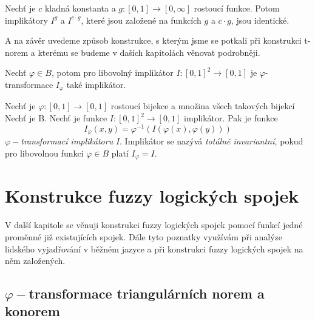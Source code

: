 \begin{sentence} \cite{habilitace}
    Nech\v t je $c$ kladn\'a konstanta a $g:[0,1] \to [0,\infty]$
    rostoucí  funkce. Potom implik\'atory $I^g$ a $I^{c \cdot g}$,
    které jsou zalo\v zen\'e na  funkcích $g$ a $c \cdot g$, jsou
    identick\'e.
\end{sentence}
A na z\'av\v er uvedeme zp\r usob konstrukce, s kter\'ym jsme se potkali p\v ri konstrukci t-norem a kter\'emu se budeme v da\v s\'ich kapitol\'ach v\v enovat podrobn\v eji.
\begin{sentence}\cite{Springer}
    Nech\v t $\varphi \in B$, potom pro libovolný implikátor $I: [0,1]^2 \rightarrow [0,1]$ je $\varphi$-transformace $I_\varphi$ také implikátor.
\end{sentence}

\begin{definition}\cite{Springer}
    Nech\v t je $\varphi:[0,1] \rightarrow [0,1]$  rostoucí
    bijekce a množina všech takových bijekcí Nech\v t je B. Nech\v t je funkce
    $I:[0,1]^2\rightarrow [0,1]$ 
    implikátor.
    Pak je funkce
    $$I_\varphi(x,y)=\varphi^{-1}(I(\varphi (x), \varphi (y)))$$
    $\varphi-${\em transformací implikátoru} $I.$ Implikátor se nazývá
    {\em totálně invariantní,} pokud pro libovolnou funkci $\varphi \in B$ platí $I_\varphi=I.$\\
\end{definition}

\section{Konstrukce fuzzy logick\'ych spojek}

V další kapitole se věnuji konstrukci fuzzy logických spojek pomocí funkcí jedné proměnné již existujících spojek. Dále tyto poznatky využívám při analýze lidského vyjadřování v běžném jazyce a při konstrukci fuzzy logických spojek na něm založených.

\subsection{$\varphi-$transformace triangulárních norem a konorem}

